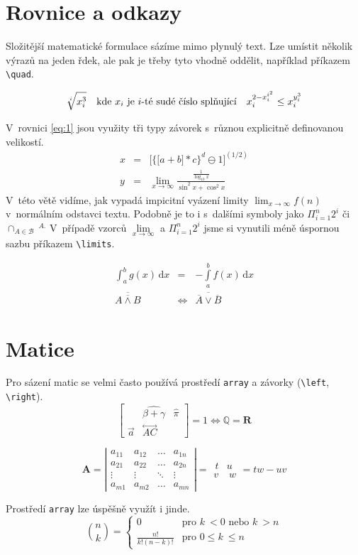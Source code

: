 \documentclass[a4paper, 11pt, twocolumn]{article}
\begin{document}
  \section{Rovnice a odkazy}
    Složitější matematické formulace sázíme mimo plynulý text. Lze umístit několik výrazů na jeden řdek, ale pak je třeby tyto vhodně oddělit, například příkazem \verb|\quad|.%

		\[ \sqrt[i]{x_i^3}\text{\quad kde } x_i \text{ je } i\text{-té sudé číslo splňující\quad}x_i^{2-x_i^{i^2}}\leq x_i^{y_i^{3}}\]
		\par
    V~rovnici \eqref{eq:1} jsou využity tři typy závorek s~různou explicitně definovanou velikostí.
		\begin{eqnarray}
			 \label{eq:1}
			 x & = & \bigg[ \Big\{\big[a + b\big] * c\Big\}^d \ominus 1 \bigg]^{(1/2)}\\
			 y & = & \lim_{x\to\infty} \frac{\frac{1}{\log_{10} x}}{\sin^2x + \cos^2x
			 \nonumber}
    \end{eqnarray}
		V~této větě vidíme, jak vypadá impicitní vyázení limity $\lim_{x\to\infty} f(n)$ v~normálním odstavci textu. Podobně je to i s~dalšími symboly jako $\Pi^{n}_{i=1} 2^{i}$ či $\cap_{A\in \mathcal{B}}\ ^{A.}$ V~případě vzorců $\lim\limits_{x\to\infty}$ a $\Pi^{n}_{i=1} 2^{i}$ jsme si vynutili méně úspornou sazbu příkazem \verb|\limits|.

    \begin{eqnarray}
		\int^b_a g(x) \, \mathrm{d}x & = & - \int\limits^b_a f(x) \, \mathrm{d}x \\
		\overline{\overline{A \wedge B}} &\Leftrightarrow& \overline{\overline{A} \vee \overline{B}}
    \end{eqnarray}

    \section{Matice}
    Pro sázení matic se velmi často používá prostředí \verb|array| a závorky (\verb|\left|, \verb|\right|).
		\[\left[\begin{array}{ccc}%
									 &   \widehat{\beta + \gamma} & \hat{\pi}    \\
					 \vec{a} &   \overset{\longleftrightarrow}{AC} &
			 \end{array}\right] = 1 \Longleftrightarrow \mathbb{Q} = \mathbf{R}\]%

\[\mathbf{A} =\left| \begin{array}{cccc}
					 a_{11}  & a_{12} & \dots  & a_{1n} \\
					 a_{21}  & a_{22} & \dots  & a_{2n} \\
					 \vdots  & \vdots & \ddots & \vdots \\
					 a_{m1} & a_{m2} & \dots  & a_{mn}
			 \end{array}\right| =
			 \begin{array}{cc}
		\,t & u    \\
		v & \:w
\end{array} = tw - uv\]

	Prostředí \texttt{array} lze úspěšně využít i jinde.
	\[
		{\binom{n}{k}} =
    \left\{\begin{array}{ll}
        0                   & \mbox{pro } k\:< 0 \mbox{ nebo } k\: > n \\
        \frac{n!}{k!(n-k)!} & \mbox{pro } 0 \leq k\: \leq n
    \end{array}\right.
\]%
\end{document}
